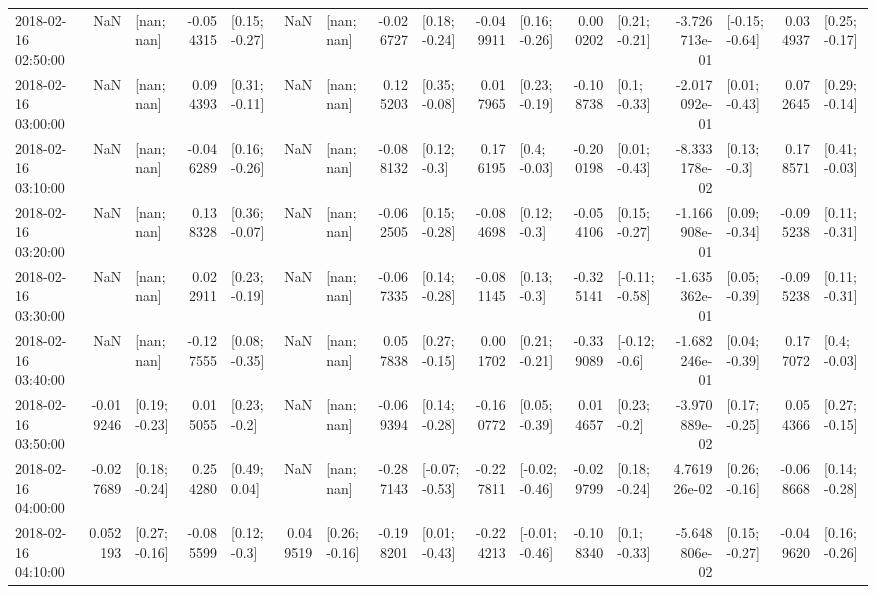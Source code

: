 \begin{tabular}{lrlrlrlrlrlrlrlrl}
2018-02-16 02:50:00 &       NaN &      [nan; nan] & -0.054315 &   [0.15; -0.27] &       NaN &      [nan; nan] & -0.026727 &   [0.18; -0.24] & -0.049911 &   [0.16; -0.26] &  0.000202 &   [0.21; -0.21] & -3.726713e-01 &  [-0.15; -0.64] &  0.034937 &   [0.25; -0.17] \\
2018-02-16 03:00:00 &       NaN &      [nan; nan] &  0.094393 &   [0.31; -0.11] &       NaN &      [nan; nan] &  0.125203 &   [0.35; -0.08] &  0.017965 &   [0.23; -0.19] & -0.108738 &    [0.1; -0.33] & -2.017092e-01 &   [0.01; -0.43] &  0.072645 &   [0.29; -0.14] \\
2018-02-16 03:10:00 &       NaN &      [nan; nan] & -0.046289 &   [0.16; -0.26] &       NaN &      [nan; nan] & -0.088132 &    [0.12; -0.3] &  0.176195 &    [0.4; -0.03] & -0.200198 &   [0.01; -0.43] & -8.333178e-02 &    [0.13; -0.3] &  0.178571 &   [0.41; -0.03] \\
2018-02-16 03:20:00 &       NaN &      [nan; nan] &  0.138328 &   [0.36; -0.07] &       NaN &      [nan; nan] & -0.062505 &   [0.15; -0.28] & -0.084698 &    [0.12; -0.3] & -0.054106 &   [0.15; -0.27] & -1.166908e-01 &   [0.09; -0.34] & -0.095238 &   [0.11; -0.31] \\
2018-02-16 03:30:00 &       NaN &      [nan; nan] &  0.022911 &   [0.23; -0.19] &       NaN &      [nan; nan] & -0.067335 &   [0.14; -0.28] & -0.081145 &    [0.13; -0.3] & -0.325141 &  [-0.11; -0.58] & -1.635362e-01 &   [0.05; -0.39] & -0.095238 &   [0.11; -0.31] \\
2018-02-16 03:40:00 &       NaN &      [nan; nan] & -0.127555 &   [0.08; -0.35] &       NaN &      [nan; nan] &  0.057838 &   [0.27; -0.15] &  0.001702 &   [0.21; -0.21] & -0.339089 &   [-0.12; -0.6] & -1.682246e-01 &   [0.04; -0.39] &  0.177072 &    [0.4; -0.03] \\
2018-02-16 03:50:00 & -0.019246 &   [0.19; -0.23] &  0.015055 &    [0.23; -0.2] &       NaN &      [nan; nan] & -0.069394 &   [0.14; -0.28] & -0.160772 &   [0.05; -0.39] &  0.014657 &    [0.23; -0.2] & -3.970889e-02 &   [0.17; -0.25] &  0.054366 &   [0.27; -0.15] \\
2018-02-16 04:00:00 & -0.027689 &   [0.18; -0.24] &  0.254280 &    [0.49; 0.04] &       NaN &      [nan; nan] & -0.287143 &  [-0.07; -0.53] & -0.227811 &  [-0.02; -0.46] & -0.029799 &   [0.18; -0.24] &  4.761926e-02 &   [0.26; -0.16] & -0.068668 &   [0.14; -0.28] \\
2018-02-16 04:10:00 &  0.052193 &   [0.27; -0.16] & -0.085599 &    [0.12; -0.3] &  0.049519 &   [0.26; -0.16] & -0.198201 &   [0.01; -0.43] & -0.224213 &  [-0.01; -0.46] & -0.108340 &    [0.1; -0.33] & -5.648806e-02 &   [0.15; -0.27] & -0.049620 &   [0.16; -0.26] \\

\end{tabular}
